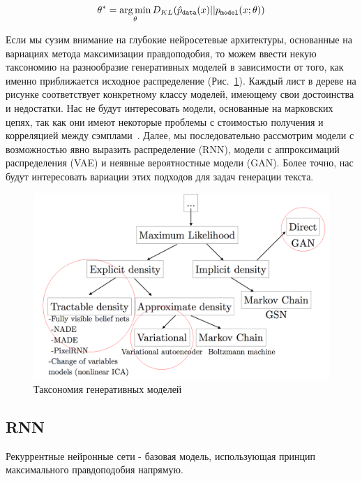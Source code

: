 \documentclass{spbau-diploma}
\begin{document}
\begin{equation}
\label{kl_maximum_likelihood}
\theta^* = \operatorname*{arg\,min}_{\theta} D_{KL}(\hat p_{\texttt{data}}(x) || p_{\texttt{model}}(x; \theta))
\end{equation}

Если мы сузим внимание на глубокие нейросетевые архитектуры, основанные на 
вариациях метода максимизации правдоподобия, то можем ввести некую таксономию 
на разнообразие генеративных моделей в зависимости от того, как именно 
приближается исходное распределение (Рис.~\ref{gen_taxonomy2}). Каждый лист в
дереве на рисунке соответствует конкретному классу моделей, имеющему свои 
достоинства и недостатки. Нас не будут интересовать модели, основанные на 
марковских цепях, так как они имеют некоторые проблемы с стоимостью получения и 
корреляцией между сэмплами~\cite{vetrovgan}. Далее, мы 
последовательно рассмотрим модели с возможностью явно выразить распределение 
(RNN), модели с аппроксимаций распределения (VAE) и неявные вероятностные 
модели (GAN). Более точно, нас будут интересовать вариации этих подходов для 
задач генерации текста.

\begin{figure}[H]
\centering
\includegraphics[width=\textwidth]{images/gen_taxonomy2.png}
\caption{Таксономия генеративных моделей~\cite{1701.00160}}
\label{gen_taxonomy2}
\end{figure}

\subsection{RNN}
Рекуррентные нейронные сети - базовая модель, использующая принцип максимального 
правдоподобия напрямую.
\end{document}
